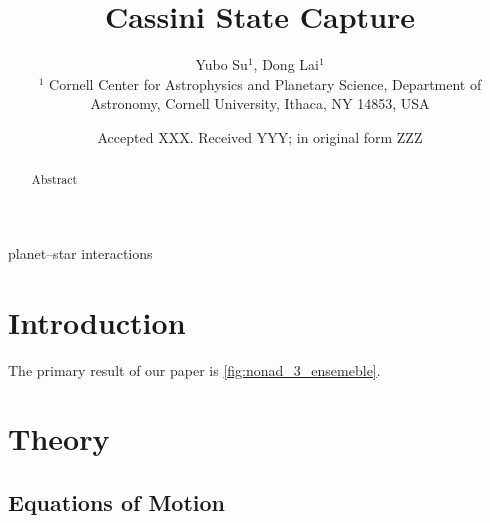 \documentclass[
        fleqn,
        usenatbib,
    ]{mnras}
\title[Cassini State Capture]{Cassini State Capture}
\author[Y. Su et\ al.]{
Yubo Su$^1$,
Dong Lai$^1$
\\
$^1$ Cornell Center for Astrophysics and Planetary Science, Department of
Astronomy, Cornell University, Ithaca, NY 14853, USA
}
\date{Accepted XXX\@. Received YYY\@; in original form ZZZ}
\begin{document}
\label{firstpage}
\pagerange{\pageref{firstpage}--\pageref{lastpage}}
\renewcommand*{\sectionautorefname}{Section}
\maketitle

\begin{abstract}
    Abstract
\end{abstract}

\begin{keywords}
planet--star interactions %
\end{keywords}

\section{Introduction}

The primary result of our paper is \autoref{fig:nonad_3_ensemeble}.

\section{Theory}\label{s:eq}

\subsection{Equations of Motion}
\end{document}
